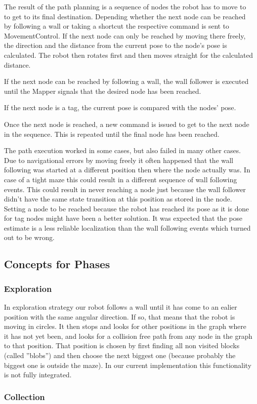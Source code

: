 The result of the path planning is a sequence of nodes the robot has to move to to get to its final destination.
Depending whether the next node can be reached by following a wall or taking a shortcut the respective command is sent to MovementControl.
If the next node can only be reached by moving there freely, the direction and the distance from the current pose to the node's pose is calculated. The robot then rotates first and then moves straight for the calculated distance. 

If the next node can be reached by following a wall, the wall follower is executed until the Mapper signals that the desired node has been reached.

If the next node is a tag, the current pose is compared with the nodes' pose.

Once the next node is reached, a new command is issued to get to the next node in the sequence. This is repeated until the final node has been reached.

The path execution worked in some cases, but also failed in many other cases. Due to navigational errors by moving freely it often happened that the wall following was started at a different position then where the node actually was. In case of a tight maze this could result in a different sequence of wall following events. This could result in never reaching a node just because the wall follower didn't have the same state transition at this position as stored in the node. Setting a node to be reached because the robot has reached its pose as it is done for tag nodes might have been a better solution. It was expected that the pose estimate is a less reliable localization than the wall following events which turned out to be wrong.    


\subsection{Concepts for Phases}
\label{subsec:conceptsStrategies}
\subsubsection{Exploration}
In exploration strategy our robot follows a wall until it has come to an ealier position with the same angular direction. If so, that means that the robot is moving in circles. It then stops and looks for other positions in the graph where it has not yet been, and looks for a collision free path from any node in the graph to that position. That position is chosen by first finding all non visited blocks (called ''blobs'') and then choose the next biggest one (because probably the biggest one is outside the maze).
In our current implementation this functionality is not fully integrated.

\subsubsection{Collection}